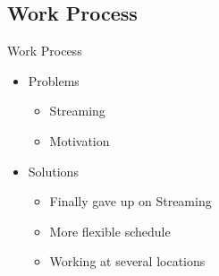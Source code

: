 \subsection{Work Process}
\begin{frame}{Work Process}
    \begin{itemize}
        \item Problems
        \begin{itemize}
            \item Streaming
            \item Motivation
        \end{itemize}
        \item Solutions
        \begin{itemize}
            \item Finally gave up on Streaming
            \item More flexible schedule
            \item Working at several locations
        \end{itemize}
    \end{itemize}
\end{frame}